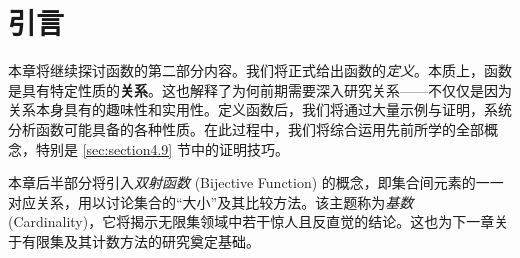 
\section{引言}

本章将继续探讨函数的第二部分内容。我们将正式给出函数的\emph{定义}。本质上，函数是具有特定性质的\textbf{关系}。这也解释了为何前期需要深入研究关系——不仅仅是因为关系本身具有的趣味性和实用性。定义函数后，我们将通过大量示例与证明，系统分析函数可能具备的各种性质。在此过程中，我们将综合运用先前所学的全部概念，特别是 \ref{sec:section4.9} 节中的证明技巧。

本章后半部分将引入\emph{双射函数} (Bijective Function) 的概念，即集合间元素的一一对应关系，用以讨论集合的``大小''及其比较方法。该主题称为\emph{基数} (Cardinality)，它将揭示无限集领域中若干惊人且反直觉的结论。这也为下一章关于有限集及其计数方法的研究奠定基础。







